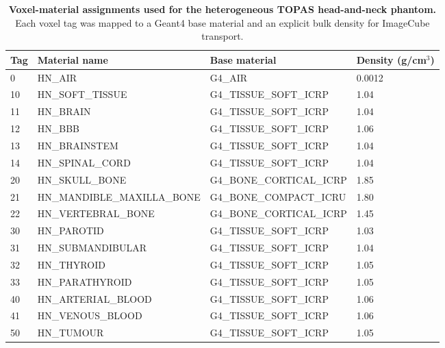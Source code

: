 \begin{table}[H]
\centering
\caption{\textbf{Voxel-material assignments used for the heterogeneous TOPAS head-and-neck phantom.} Each voxel tag was mapped to a Geant4 base material and an explicit bulk density for ImageCube transport.}
\label{tab:voxel_materials}
\small
\begin{tabular}{llll}
\toprule
Tag & Material name & Base material & Density (g/cm$^3$) \\
\midrule
0 & HN\_AIR & G4\_AIR & 0.0012 \\
10 & HN\_SOFT\_TISSUE & G4\_TISSUE\_SOFT\_ICRP & 1.04 \\
11 & HN\_BRAIN & G4\_TISSUE\_SOFT\_ICRP & 1.04 \\
12 & HN\_BBB & G4\_TISSUE\_SOFT\_ICRP & 1.06 \\
13 & HN\_BRAINSTEM & G4\_TISSUE\_SOFT\_ICRP & 1.04 \\
14 & HN\_SPINAL\_CORD & G4\_TISSUE\_SOFT\_ICRP & 1.04 \\
20 & HN\_SKULL\_BONE & G4\_BONE\_CORTICAL\_ICRP & 1.85 \\
21 & HN\_MANDIBLE\_MAXILLA\_BONE & G4\_BONE\_COMPACT\_ICRU & 1.80 \\
22 & HN\_VERTEBRAL\_BONE & G4\_BONE\_CORTICAL\_ICRP & 1.45 \\
30 & HN\_PAROTID & G4\_TISSUE\_SOFT\_ICRP & 1.03 \\
31 & HN\_SUBMANDIBULAR & G4\_TISSUE\_SOFT\_ICRP & 1.04 \\
32 & HN\_THYROID & G4\_TISSUE\_SOFT\_ICRP & 1.05 \\
33 & HN\_PARATHYROID & G4\_TISSUE\_SOFT\_ICRP & 1.05 \\
40 & HN\_ARTERIAL\_BLOOD & G4\_TISSUE\_SOFT\_ICRP & 1.06 \\
41 & HN\_VENOUS\_BLOOD & G4\_TISSUE\_SOFT\_ICRP & 1.06 \\
50 & HN\_TUMOUR & G4\_TISSUE\_SOFT\_ICRP & 1.05 \\
\bottomrule
\end{tabular}
\end{table}
